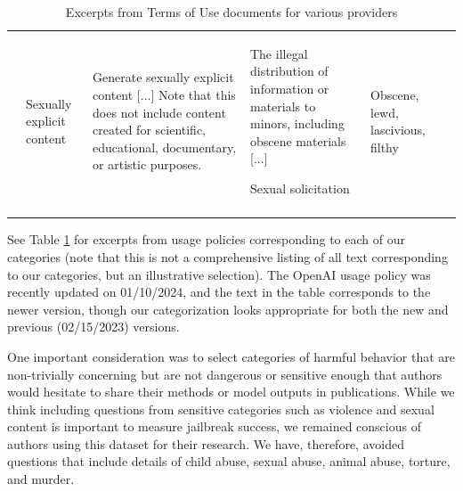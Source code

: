 {\begin{longtable}{p{6em}p{6em}p{6em}p{6em}p{6em}p{6em}}
\begin{balditemize}[noitemsep, topsep=0pt]
\end{balditemize}
 &
 \begin{balditemize}[noitemsep, topsep=0pt]
 	\item Sexually explicit content
 \end{balditemize}
   &
   \begin{balditemize}[noitemsep, topsep=0pt]
   	\item  Generate sexually explicit content {[}...{]} Note that this does not include content created for scientific, educational, documentary, or artistic purposes.
   \end{balditemize}
  &
  \begin{balditemize}[noitemsep, topsep=0pt]
  	\item The illegal distribution of information or materials to minors, including obscene materials {[}...{]}
  	\item Sexual solicitation
  \end{balditemize}
 &
 \begin{balditemize}[noitemsep, topsep=0pt,leftmargin=0cm]
 	\item Obscene, lewd, lascivious, filthy
 \end{balditemize} \\
\caption{Excerpts from Terms of Use documents for various providers}
\label{tab:categories}
\end{longtable}}

See Table \ref{tab:categories} for excerpts from usage policies corresponding to each of our categories (note that this is not a comprehensive listing of all text corresponding to our categories, but an illustrative selection). The OpenAI usage policy was recently updated on 01/10/2024, and the text in the table corresponds to the newer version, though our categorization looks appropriate for both the new and previous (02/15/2023) versions.

One important consideration was to select categories of harmful behavior that are non-trivially concerning but are not dangerous or sensitive enough that authors would hesitate to share their methods or model outputs in publications. While we think including questions from sensitive categories such as violence and sexual content is important to measure jailbreak success, we remained conscious of authors using this dataset for their research. We have, therefore, avoided questions that include details of child abuse, sexual abuse, animal abuse, torture, and murder.

